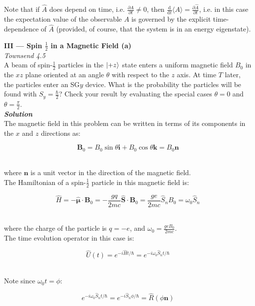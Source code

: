 \documentclass[9pt]{extarticle}
\renewcommand{\v}[1]{{\bm #1}}
\newcommand{\hv}[1]{\hat{\bm{#1}}}
\newcommand{\bfit}[1]{\textbf{\textit{#1}}}
\renewcommand{\d}{\text{d}}
\newcommand{\ddt}[1]{\frac{\d #1}{\d t}}
\newcommand{\pd}[2]{\frac{\partial #1}{\partial #2}}
\begin{document}
\begin{multicols*}{2}
Note that if $\hat A$ does depend on time, i.e. $\pd{\hat A}{t} \neq 0$, then $\ddt{} \langle A \rangle = \pd{\hat A}{t}$, i.e. in this case the expectation value of the observable $A$ is governed by the explicit time-dependence of $\hat A$ (provided, of course, that the system is in an energy eigenstate). \\ 





\hrulefill 

\newpage

{\bf \LARGE III --- Spin $\frac 12$ in a Magnetic Field (a)} \\ 

{\it Townsend 4.5} \\ 
A beam of spin-$\frac 12$ particles in the $\ket{+z}$ state enters a uniform magnetic field $B_0$ in the $xz$ plane oriented at an angle $\theta$ with respect to the $z$ axis. At time $T$ later, the particles enter an SG$y$ device. What is the probability the particles will be found with $S_y = \frac \hbar 2$? Check your result by evaluating the special cases $\theta = 0$ and $\theta = \frac \pi 2$. \\ 


{\bfit{Solution}} \\ 
The magnetic field in this problem can be written in terms of its components in the $x$ and $z$ directions as:

$$\v B_0 = B_0 \sin\theta \v i + B_0 \cos\theta \v k = B_0 \v n$$ \

where $\v n$ is a unit vector in the direction of the magnetic field. \\

The Hamiltonian of a spin-$\frac 12$ particle in this magnetic field is:

$$\hat H = -\hv \mu \cdot \v B_0 = -\frac{gq}{2mc} \hv S \cdot \v B_0 = \frac{ge}{2mc} \hat S_n B_0 = \omega_0 \hat S_n$$ \ 

where the charge of the particle is $q = -e$, and $\omega_0 = \frac{ge B_0}{2mc}$. \\  

The time evolution operator in this case is:

$$\hat U(t) = e^{-i \hat H t / \hbar} = e^{-i \omega_0 \hat S_n t / \hbar}$$ \ 

Note since $\omega_0 t = \phi$:

$$e^{-i \omega_0 \hat S_n t / \hbar} = e^{-i \hat S_n \phi / \hbar} = \hat R(\phi \v n)$$ \ 


\end{multicols*}
\end{document}
